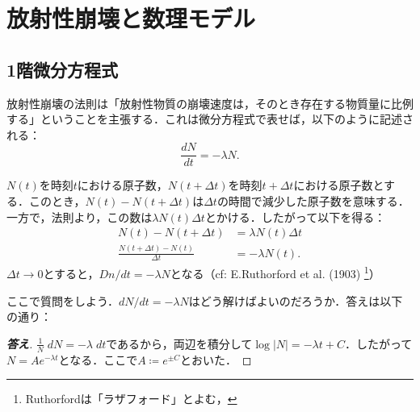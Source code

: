 \section{放射性崩壊と数理モデル} %
\subsection{1階微分方程式}
放射性崩壊の法則は「放射性物質の崩壊速度は，そのとき存在する物質量に比例する」ということを主張する．これは微分方程式で表せば，以下のように記述される：
\begin{equation}
    \frac{dN}{dt} = -\lambda N.
\end{equation}

$N(t)$を時刻$t$における原子数，$N(t+\Delta t)$を時刻$t+\Delta t$における原子数とする．このとき，$N(t)-N(t+\Delta t)$は$\Delta t$の時間で減少した原子数を意味する．一方で，法則より，この数は$\lambda N(t)\Delta t$とかける．したがって以下を得る：
\begin{align*}
    N(t)-N(t+\Delta t) &= \lambda N(t)\Delta t \\
    \frac{N(t+\Delta t)-N(t)}{\Delta t} &= -\lambda N(t).
\end{align*}
$\Delta t \to 0$とすると，$Dn/dt =-\lambda N$となる（cf: E.\;Ruthorford et al. (1903) \footnote{Ruthorfordは「ラザフォード」とよむ，}）

ここで質問をしよう．$dN/dt = -\lambda N$はどう解けばよいのだろうか．答えは以下の通り：
\begin{proof}[\textbf{答え}]
    $\frac{1}{N} \; dN = -\lambda \; dt$であるから，両辺を積分して$\log|N| = -\lambda t + C$．したがって$N = Ae^{-\lambda t}$となる．ここで$A \coloneqq e^{\pm C}$とおいた．
\end{proof}